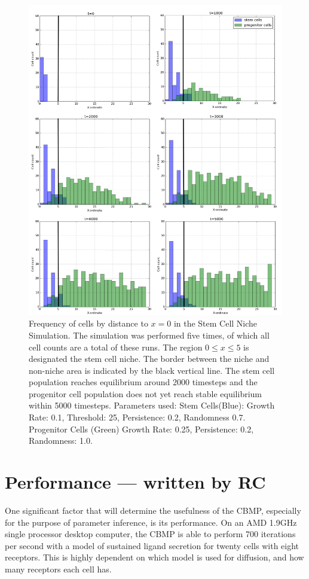 \documentclass[12pt]{article}
\begin{document}
\begin{figure}[H]
\centering
\includegraphics[width=13.51cm]{media/6sim.png}
\caption{Frequency of cells by distance to \(x=0\) in the Stem Cell Niche
  Simulation. The simulation was performed five times, of which all cell 
counts are a total of these runs. The region \(0 \leq x \leq 5\) is 
designated the stem cell niche. The border between the niche and 
non-niche area is indicated by the black vertical line. 
The stem cell population reaches equilibrium around 2000 timesteps 
and the progenitor cell population does not yet reach stable equilibrium 
within 5000 timesteps.
Parameters used: Stem Cells(Blue): Growth Rate: 0.1, Threshold: 25, 
Persistence: 0.2, Randomness 0.7. Progenitor Cells (Green) 
Growth Rate: 0.25, Persistence: 0.2, Randomness: 1.0. 
}
\end{figure}

\section{Performance --- written by RC}
One significant factor that will determine the usefulness of the CBMP, 
especially for the purpose of parameter inference, is its performance. 
On an AMD 1.9GHz single processor desktop computer, the CBMP is able to 
perform 700 iterations per second with a model of sustained ligand 
secretion for twenty cells with eight receptors. This is highly 
dependent on which model is used for diffusion, and how many receptors 
each cell has.
\end{document}

